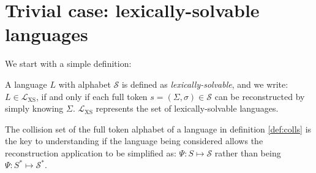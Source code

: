 
\section{Trivial case: lexically-solvable languages}
\label{sec:lexs}

We start with a simple definition:

\begin{definition} \label{def:lexsolv}
A language $L$ with alphabet $\mathcal{S}$ is defined as \textit{lexically-solvable},
and we write: $L \in \mathcal{L}_{\text{XS}}$, if
and only if each full
token $s = (\Sigma, \sigma) \in \mathcal{S}$ can be reconstructed by simply knowing $\Sigma$.
$\mathcal{L}_{\text{XS}}$ represents the set of lexically-solvable languages.
\end{definition}

The collision set of the full token alphabet of a language in definition \ref{def:colls} is the key to
understanding if the language being considered allows the reconstruction application to be simplified as:
$\Psi : S \mapsto \mathcal{S}$ rather than being $\Psi : S^\ast \mapsto \mathcal{S}^\ast$.

